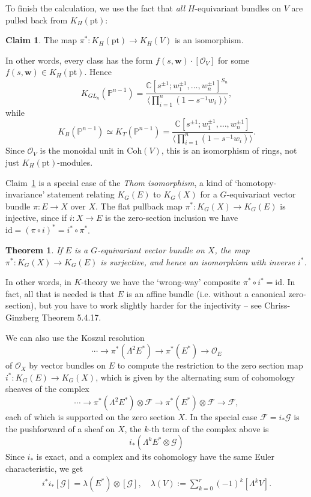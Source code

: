 \documentclass[11pt]{amsart}
\newtheorem{theorem}[dummy]{Theorem}
\theoremstyle{definition}
\newtheorem{claim}[dummy]{Claim}
\newcommand{\bC}{\mathbb{C}}
\newcommand{\bP}{\mathbb{P}}
\newcommand{\Fc}{\mathcal{F}}
\newcommand{\Oc}{\mathcal{O}}
\newcommand{\Coh}{\mathrm{Coh}}
\numberwithin{equation}{subsection}
\numberwithin{figure}{subsection}
\newcommand{\pt}{\mathrm{pt}}
\begin{document}
To finish the calculation, we use the fact that \emph{all} $H$-equivariant bundles on $V$ are pulled back from $K_{H}(\pt)$:
\begin{claim}
\label{claim:thom}
The map $\pi^*\colon K_H(\pt)\rightarrow K_H(V)$ is an isomorphism.
\end{claim}
In other words, every class has the form $f(s,\mathbf{w})\cdot [\Oc_V]$ for some $f(s,\mathbf{w})\in K_H(\pt)$. Hence
$$
K_{GL_n}(\bP^{n-1}) = \frac{\bC[s^{\pm1};w_1^{\pm1},\ldots, w_{n}^{\pm1}]^{S_n}}{\langle\prod_{i=1}^{n}(1-s^{-1}w_i)\rangle},
$$
while
$$
K_B(\bP^{n-1})\simeq K_T(\bP^{n-1}) = \frac{\bC[s^{\pm1};w_1^{\pm1},\ldots, w_{n}^{\pm1}]}{\langle\prod_{i=1}^{n}(1-s^{-1}w_i)\rangle}.
$$
Since $\Oc_V$ is the monoidal unit in $\Coh(V)$, this is an isomorphism of rings, not just $K_H(\pt)$-modules.


Claim~\ref{claim:thom} is a special case of the \emph{Thom isomorphism}, a kind of `homotopy-invariance' statement relating $K_G(E)$ to $K_G(X)$ for a $G$-equivariant vector bundle $\pi:E\rightarrow X$ over $X$. The flat pullback map $\pi^*:K_G(X)\rightarrow K_G(E)$ is injective, since if $i:X\rightarrow E$ is the zero-section inclusion we have $\mathrm{id}=(\pi\circ i)^*= i^*\circ\pi^*$.
\begin{theorem}
\label{thm:thom-iso}
If $E$ is a $G$-equivariant vector bundle on $X$, the map $\pi^*\colon K_G(X)\rightarrow K_G(E)$ is surjective, and hence an isomorphism with inverse $i^*$.
\end{theorem}
In other words, in $K$-theory we have the `wrong-way' composite $\pi^*\circ i^*=\mathrm{id}$.
In fact, all that is needed is that $E$ is an affine bundle (i.e. without a canonical zero-section), but you have to work slightly harder for the injectivity -- see Chriss-Ginzberg Theorem 5.4.17.

We can also use the Koszul resolution 
$$
\cdots \rightarrow\pi^*(\Lambda^2 E^*)\rightarrow \pi^*(E^*)\rightarrow \Oc_E
$$
of $\Oc_X$ by vector bundles on $E$ to compute the restriction to the zero section map $i^*:K_G(E)\rightarrow K_G(X)$, which is given by the alternating sum of cohomology sheaves of the complex 
$$
\cdots \rightarrow\pi^*(\Lambda^2 E^*)\otimes \Fc\rightarrow \pi^*(E^*)\otimes \Fc\rightarrow \Fc,
$$
each of which is supported on the zero section $X$. In the special case $\mathcal{F}=i_*\mathcal{G}$ is the pushforward of a sheaf on $X$, the $k$-th term of the complex above is 
$$
i_*(\Lambda^kE^*\otimes \mathcal{G})
$$
Since $i_*$ is exact, and a complex and its cohomology have the same Euler characteristic, we get
\begin{align}
\label{eq:ipushpull}
i^*i_*[\mathcal{G}] =  \lambda(E^*)\otimes[\mathcal{G}], \quad \lambda(V):= \sum_{k=0}^r(-1)^{k}[\Lambda^kV].
\end{align}
\end{document}

